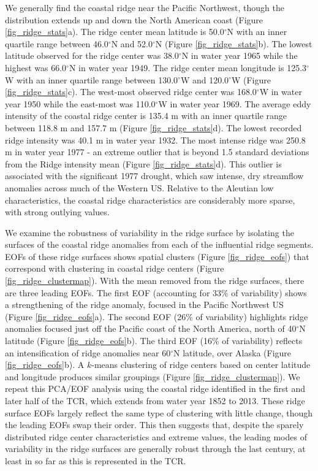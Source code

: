 \documentclass[final, double]{ua-thesis}
\begin{document}
We generally find the coastal ridge near the Pacific Northwest, though the distribution extends up and down the North American coast (Figure \ref{fig_ridge_stats}a). The ridge center mean latitude is 50.0$^{\circ}$N with an inner quartile range between 46.0$^{\circ}$N and 52.0$^{\circ}$N (Figure \ref{fig_ridge_stats}b). The lowest latitude observed for the ridge center was 38.0$^{\circ}$N in water year 1965 while the highest was 66.0$^{\circ}$N in water year 1949. The ridge center mean longitude is 125.3$^{\circ}$W with an inner quartile range between 130.0$^{\circ}$W and 120.0$^{\circ}$W (Figure \ref{fig_ridge_stats}c). The west-most observed ridge center was 168.0$^{\circ}$W in water year 1950 while the east-most was 110.0$^{\circ}$W in water year 1969. The average eddy intensity of the coastal ridge center is 135.4 m with an inner quartile range between 118.8 m and 157.7 m (Figure \ref{fig_ridge_stats}d). The lowest recorded ridge intensity was 40.1 m in water year 1932. The most intense ridge was 250.8 m in water year 1977 - an extreme outlier  that is beyond 1.5 standard deviations from the Ridge intensity mean (Figure \ref{fig_ridge_stats}d). This outlier is associated with the significant 1977 drought, which saw intense, dry streamflow anomalies across much of the Western US. Relative to the Aleutian low characteristics, the coastal ridge characteristics are considerably more sparse, with strong outlying values. 

We examine the robustness of variability in the ridge surface by isolating the surfaces of the coastal ridge anomalies from each of the influential ridge segments. EOFs of these ridge surfaces shows spatial clusters (Figure \ref{fig_ridge_eofs}) that correspond with clustering  in coastal ridge centers (Figure \ref{fig_ridge_clustermap}). With the mean removed from the ridge surfaces, there are three leading EOFs. The first EOF (accounting for 33\% of variability) shows a strengthening of the ridge anomaly, focused in the Pacific Northwest US (Figure \ref{fig_ridge_eofs}a). The second EOF (26\% of variability) highlights ridge anomalies focused just off the Pacific coast of the North America, north of 40$^{\circ}$N latitude (Figure \ref{fig_ridge_eofs}b). The third EOF (16\% of variability) reflects an intensification of ridge anomalies near 60$^{\circ}$N latitude, over Alaska (Figure \ref{fig_ridge_eofs}b). A $k$-means clustering of ridge centers based on center latitude and longitude produces similar groupings (Figure \ref{fig_ridge_clustermap}). We repeat this PCA/EOF analysis using the coastal ridge identified in the first and later half of the TCR, which extends from water year 1852 to 2013. These ridge surface EOFs largely reflect the same type of clustering with little change, though the leading EOFs swap their order. This then suggests that, despite the sparely distributed ridge center characteristics and extreme values, the leading modes of variability in the ridge surfaces are generally robust through the last century, at least in so far as this is represented in the TCR.
\end{document}
